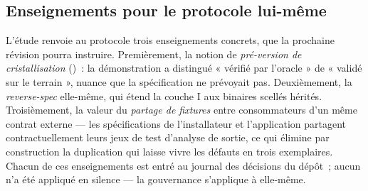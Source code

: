 \subsection{Enseignements pour le protocole lui-même}

L’étude renvoie au protocole trois enseignements concrets, que la
prochaine révision pourra instruire. Premièrement, la notion de
\emph{pré-version de cristallisation} ()~: la démonstration a
distingué « vérifié par l’oracle » de « validé sur le terrain », nuance
que la spécification ne prévoyait pas. Deuxièmement, la \emph{reverse-spec}
elle-même, qui étend la couche I aux binaires scellés hérités. Troisièmement,
la valeur du \emph{partage de fixtures} entre consommateurs d’un même
contrat externe — les spécifications de l’installateur et l’application
partagent contractuellement leurs jeux de test d’analyse de sortie, ce qui
élimine par construction la duplication qui laisse vivre les défauts en
trois exemplaires. Chacun de ces enseignements est entré au journal des
décisions du dépôt~; aucun n’a été appliqué en silence — la gouvernance
s’applique à elle-même.
